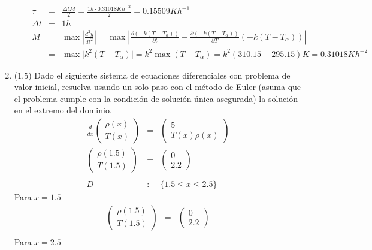 \documentclass[12pt]{article}
\newcommand{\diffl}[3]{\frac{d^{#3}}{d#2^{#3}}#1}
\begin{document}
\begin{enumerate}[leftmargin=*,widest=9]
\begin{enumerate}[label=\alph*]
\begin{eqnarray*}
   \tau &=& \frac{\Delta tM}{2} = \frac{1h\cdot 0.31018Kh^{-2}}{2} = 0.15509Kh^{-1} \\ \Delta t &=& 1h \\ M &=& \max \left\vert \frac{d^2 y}{dt^2}\right\vert = \max \left\vert \frac{\partial (-k(T-T_{\alpha}))}{\partial t} +\frac{\partial (-k(T-T_{\alpha}))}{\partial T} (-k(T-T_{\alpha}))\right\vert \\  &=& \max \vert  k^2 (T -T_{\alpha} )\vert = k^2 \max (T -T_{\alpha}) = k^2 (310.15-295.15)K = 0.31018Kh^{-2}
   \end{eqnarray*}
    \end{enumerate}
    \item (\(1.5\)) Dado el siguiente sistema de ecuaciones diferenciales con problema de valor inicial, resuelva usando un solo paso con el método de Euler (asuma que el problema cumple con la condición de solución única asegurada) la solución en el extremo del dominio.
    \begin{eqnarray*}
    \diffl{
		\begin{pmatrix}
			\rho(x) \\ T(x)
		\end{pmatrix}
    }{x}{} &=& \begin{pmatrix}
    5 \\ T(x)\rho(x)
    \end{pmatrix} \\
    \begin{pmatrix}
    \rho(1.5) \\ T(1.5)
    \end{pmatrix} &=& \begin{pmatrix}
    0 \\ 2.2
    \end{pmatrix} \\
    \\
    D &:& \lbrace 1.5 \leq x \leq 2.5 \rbrace
    \end{eqnarray*}
    Para $x= 1.5$
    \begin{eqnarray*}
    	\begin{pmatrix}
			\rho(1.5) \\ T(1.5)
		\end{pmatrix}
     &=& \begin{pmatrix}
    0 \\ 2.2
    \end{pmatrix} \\
    \end{eqnarray*}
    Para $x= 2.5$
    \begin{eqnarray*}

\end{eqnarray*}
\end{enumerate}
\end{document}
